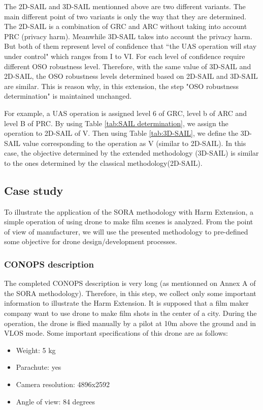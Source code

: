 \documentclass[a4paper, 10, conference]{ieeeconf}  %
\begin{document}
The 2D-SAIL and 3D-SAIL mentionned above are two different variants. The main different point of two variants is only the way that they are determined. The 2D-SAIL is a combination of GRC and ARC without taking into account PRC (privacy harm). Meanwhile 3D-SAIL takes into account the privacy harm. But both of them represent level of confidence that ``the UAS operation will stay under control" which ranges from I to VI. For each level of confidence require different OSO robustness level. Therefore, with the same value of 3D-SAIL and 2D-SAIL, the OSO robustness levels determined based on 2D-SAIL and 3D-SAIL are similar. This is reason why, in this extension, the step "OSO robustness determination" is maintained unchanged.

For example, a UAS operation is assigned level 6 of GRC, level b of ARC and level B of PRC. By using Table \ref{tab:SAIL determination}, we assign the operation to 2D-SAIL of V. Then using Table \ref{tab:3D-SAIL}, we define the 3D-SAIL value corresponding to the operation as V (similar to 2D-SAIL). In this case, the objective determined by the extended methodology (3D-SAIL) is similar to the ones determined by the classical methodology(2D-SAIL). 


\subsection{Case study} \label{sec:cas}

To illustrate the application of the SORA methodology with Harm Extension, a simple operation of using drone to make film scenes is analyzed. From the point of view of manufacturer, we will use the presented methodology to pre-defined some objective for drone design/development processes.

\subsubsection{CONOPS description}
The completed CONOPS description is very long (as mentionned on Annex A of the SORA methodology). Therefore, in this step, we collect only some important information to illustrate the Harm Extension. It is supposed that a film maker company want to use drone to make film shots in the center of a city. During the operation, the drone is flied manually by a pilot at 10m above the ground and in VLOS mode. Some important specifications of this drone are as follows:
\begin{itemize}
    \item Weight: 5 kg
    \item Parachute: yes
    \item Camera resolution: 4896x2592
    \item Angle of view: 84 degrees
\end{itemize}
\end{document}
